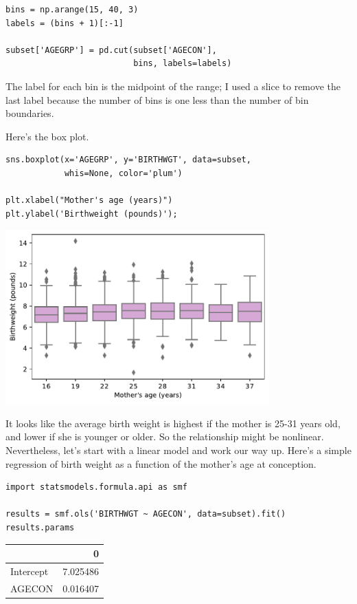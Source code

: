 \begin{lstlisting}[]
bins = np.arange(15, 40, 3)
labels = (bins + 1)[:-1]

subset['AGEGRP'] = pd.cut(subset['AGECON'], 
                          bins, labels=labels)
\end{lstlisting}

The label for each bin is the midpoint of the range; I used a slice to
remove the last label because the number of bins is one less than the
number of bin boundaries.

Here's the box plot.

\begin{lstlisting}[]
sns.boxplot(x='AGEGRP', y='BIRTHWGT', data=subset, 
            whis=None, color='plum')

plt.xlabel("Mother's age (years)")
plt.ylabel('Birthweight (pounds)');
\end{lstlisting}

\begin{center}
\includegraphics[width=4in]{chapters/13_hypothesis_files/13_hypothesis_117_0.pdf}
\end{center}

It looks like the average birth weight is highest if the mother is 25-31
years old, and lower if she is younger or older. So the relationship
might be nonlinear. Nevertheless, let's start with a linear model and
work our way up. Here's a simple regression of birth weight as a
function of the mother's age at conception.

\begin{lstlisting}[]
import statsmodels.formula.api as smf

results = smf.ols('BIRTHWGT ~ AGECON', data=subset).fit()
results.params
\end{lstlisting}

\begin{tabular}{lr}
\midrule
{} &         0 \\
\midrule
Intercept &  7.025486 \\
AGECON    &  0.016407 \\
\midrule
\end{tabular}

